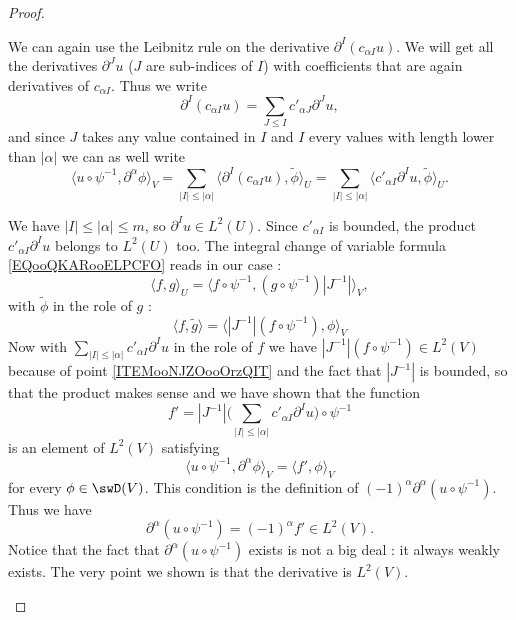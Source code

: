 \begin{proof}
\begin{subproof}
        We can again use the Leibnitz rule on the derivative \( \partial^{I}(c_{\alpha I} u)\). We will get all the derivatives \( \partial^Ju\) (\( J\) are sub-indices of \( I\)) with coefficients that are again derivatives of \( c_{\alpha I}\). Thus we write 
        \begin{equation}
            \partial^I(c_{\alpha I}u)=\sum_{J\leq I}c'_{\alpha J}\partial^Ju,
        \end{equation}
        and since \( J\) takes any value contained in \( I\) and \( I\) every values with length lower than \( | \alpha |\) we can as well write
        \begin{equation}
             \langle u\circ\psi^{-1}, \partial^{\alpha}\phi\rangle_V =  \sum_{| I |\leq | \alpha |}\langle \partial^{I}(c_{\alpha I}u), \tilde \phi\rangle_U =\sum_{| I |\leq | \alpha |}\langle c'_{\alpha I}\partial^Iu, \tilde \phi\rangle_U.
        \end{equation}

        We have \( | I |\leq | \alpha |\leq m\), so \( \partial^Iu\in L^2(U)\). Since \( c'_{\alpha I}\) is bounded, the product \( c'_{\alpha I}\partial^Iu\) belongs to \( L^2(U)\) too. The integral change of variable formula \eqref{EQooQKARooELPCFO} reads in our case :
        \begin{equation}
            \langle f, g\rangle_U=\langle f\circ \psi^{-1}, (g\circ\psi^{-1})| J^{-1} |\rangle_V,
        \end{equation}
        with \( \tilde \phi\) in the role of \( g\) :
        \begin{equation}
            \langle f, \tilde g\rangle =\langle | J^{-1} |(f\circ\psi^{-1}), \phi\rangle_V
        \end{equation}
        Now with \( \sum_{| I |\leq | \alpha |}c'_{\alpha I}\partial^Iu\) in the role of \( f\) we have \( | J^{-1} |(f\circ\psi^{-1})\in L^2(V)\) because of point \ref{ITEMooNJZOooOrzQIT} and the fact that \( | J^{-1} |\) is bounded, so that the product makes sense and we have shown that the function
        \begin{equation}
            f'=| J^{-1} |\big( \sum_{| I |\leq | \alpha |}c'_{\alpha I}\partial^Iu \big)\circ\psi^{-1}
        \end{equation}
        is an element of \( L^2(V)\) satisfying
        \begin{equation}
              \langle u\circ\psi^{-1}, \partial^{\alpha}\phi\rangle_V =   \langle f', \phi\rangle_V
        \end{equation}
        for every \( \phi\in\swD(V)\). This condition is the definition of \(   (-1)^{\alpha} \partial^{\alpha}(u\circ\psi^{-1})\). Thus we have
        \begin{equation}
            \partial^{\alpha}(u\circ\psi^{-1})=(-1)^{\alpha}f'\in L^2(V).
        \end{equation}
        Notice that the fact that \( \partial^{\alpha}(u\circ\psi^{-1})\) exists is not a big deal : it always weakly exists. The very point we shown is that the derivative is \( L^2(V)\).
          

\end{subproof}
\end{proof}
